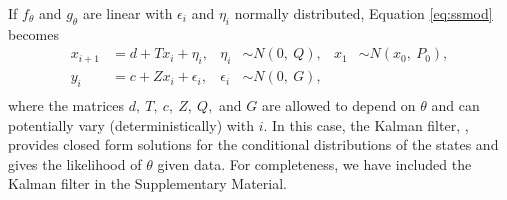 \documentclass[aoas]{imsart}
\DeclareRobustCommand{\varx}{{\mathpalette\irchi\relax}}
\newcommand{\irchi}[2]{\protect\raisebox{\depth}{$#1\upchi$}}
\begin{document}
If $f_\theta$ and $g_\theta$ are linear with $\epsilon_i$ and
$\eta_i$ normally distributed, Equation \eqref{eq:ssmod} becomes
\begin{equation}
  \begin{aligned}
    x_{i+1}&= d+T x_i + \eta_{i}, 
    & \eta_i &\sim N(0,\ Q),     
    &x_1 &\sim N(x_0,\ P_0),\\
    y_i&= c + Z x_i + \epsilon_i,     
    & \epsilon_i &\sim N(0,\ G), \\
  \end{aligned}
  \label{eq:lgmod}
\end{equation}
where the matrices $d,\ T,\ c,\ Z,\ Q,$ and $G$ are allowed to depend
on $\theta$ and can potentially vary (deterministically) with $i$. In this case,
the Kalman filter, %
\citep[see e.g.,][]{Kalman1960,Harvey1990},
provides closed form 
solutions for the conditional
distributions of the states and gives the likelihood of $\theta$
given data. For completeness, we have included the Kalman filter in
the Supplementary Material.%
\end{document}
